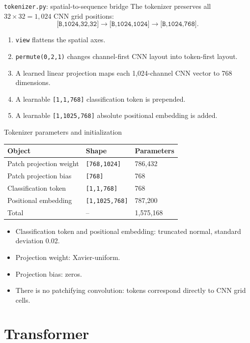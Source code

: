 \documentclass[aspectratio=169,10pt]{beamer}
\newcommand{\shape}[1]{\texttt{#1}}
\newcommand{\file}[1]{\texttt{#1}}
\newcommand{\code}[1]{\texttt{#1}}
\begin{document}
\begin{frame}{\file{tokenizer.py}: spatial-to-sequence bridge}
  The tokenizer preserves all $32\times32=1,024$ CNN grid positions:
  \[
    \shape{[B,1024,32,32]}
    \rightarrow
    \shape{[B,1024,1024]}
    \rightarrow
    \shape{[B,1024,768]}.
  \]
  \begin{enumerate}
    \item \code{view} flattens the spatial axes.
    \item \code{permute(0,2,1)} changes channel-first CNN layout into token-first layout.
    \item A learned linear projection maps each 1,024-channel CNN vector to 768 dimensions.
    \item A learnable \shape{[1,1,768]} classification token is prepended.
    \item A learnable \shape{[1,1025,768]} absolute positional embedding is added.
  \end{enumerate}
\end{frame}

\begin{frame}{Tokenizer parameters and initialization}
  \centering
  \begin{tabular}{lll}
    \toprule
    Object & Shape & Parameters\\
    \midrule
    Patch projection weight & \shape{[768,1024]} & 786,432\\
    Patch projection bias & \shape{[768]} & 768\\
    Classification token & \shape{[1,1,768]} & 768\\
    Positional embedding & \shape{[1,1025,768]} & 787,200\\
    \midrule
    Total & -- & 1,575,168\\
    \bottomrule
  \end{tabular}
  \vspace{0.8em}
  \begin{itemize}
    \item Classification token and positional embedding: truncated normal, standard deviation 0.02.
    \item Projection weight: Xavier-uniform.
    \item Projection bias: zeros.
    \item There is no patchifying convolution: tokens correspond directly to CNN grid cells.
  \end{itemize}
\end{frame}

\section{Transformer}
\end{document}
